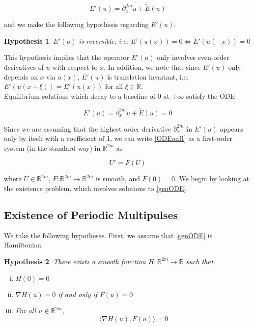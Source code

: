 \documentclass[12pt]{article}
\def\R{{\mathbb R}}
\newtheorem{hypothesis}{Hypothesis}
\begin{document}
\[
E'(u) = \partial_x^{2m}u + \tilde{E}(u)
\]

and we make the following hypothesis regarding $E'(u)$.

\begin{hypothesis}\label{reversiblehyp}
$E'(u)$ is reversible, i.e. $E'(u(x)) = 0 \iff E'(u(-x)) = 0$
\end{hypothesis}

This hypothesis implies that the operator $E'(u)$ only involves even-order derivatives of $u$ with respect to $x$. In addition, we note that since $E'(u)$ only depends on $x$ via $u(x)$, $E'(u)$ is translation invariant, i.e. $E'(u(x+\xi)) = E'(u(x))$ for all $\xi \in \R$.\\

Equilibrium solutions which decay to a baseline of 0 at $\pm \infty$ satisfy the ODE 

\begin{equation}\label{ODEonR}
E'(u) = \partial_x^{2m}u + \tilde{E}(u) = 0
\end{equation}

Since we are assuming that the highest order derivative $\partial_x^{2m}$ in $E'(u)$ appears only by itself with a coefficient of 1, we can write \eqref{ODEonR} as a first-order system (in the standard way) in $\R^{2m}$ as

\begin{equation}\label{genODE}
U' = F(U)
\end{equation}

where $U \in \R^{2m}$, $F: \R^{2m} \rightarrow \R^{2m}$ is smooth, and $F(0) = 0$. We begin by looking at the existence problem, which involves solutions to \eqref{genODE}.

\subsection{Existence of Periodic Multipulses}

We take the following hypotheses. First, we assume that \eqref{genODE} is Hamiltonian.

\begin{hypothesis}\label{Hhyp}
There exists a smooth function $H: \R^{2m} \rightarrow \R$ such that 
\begin{enumerate}[(i)]
\item $H(0) = 0$
\item $\nabla H(u) = 0$ if and only if $F(u) = 0$
\item For all $u \in \R^{2m}$,
\begin{equation}
\langle \nabla H(u), F(u) \rangle = 0
\end{equation}
\end{enumerate}
\end{hypothesis}
\end{document}

